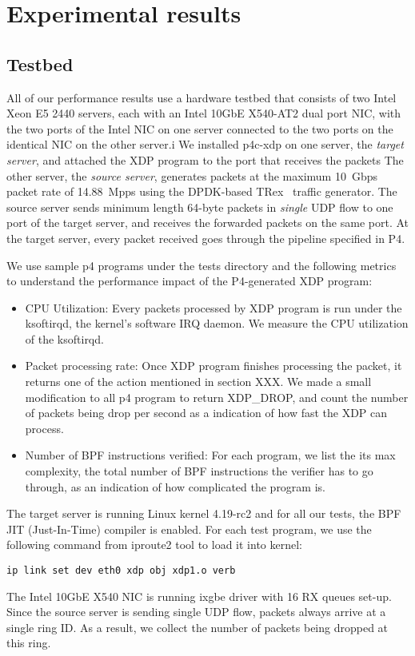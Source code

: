 \section{Experimental results}\label{sec:results}

\subsection{Testbed}
All of our performance results use a hardware testbed that consists of
two Intel Xeon E5 2440 servers, each with an Intel 10GbE X540-AT2 dual
port NIC, with the two ports of the Intel NIC on one server connected
to the two ports on the identical NIC on the other server.i
We installed p4c-xdp on one server, the {\em target server}, and
attached the XDP program to the port that receives the packets
The other server, the {\em source server}, generates packets
at the maximum 10~Gbps packet rate of 14.88~Mpps using the DPDK-based
TRex~\cite{trex} traffic generator.  The source server sends minimum
length 64-byte packets in {\em single} UDP flow to one port of the
target server, and receives the forwarded packets on the same port.
At the target server, every packet received goes through the
pipeline specified in P4.

We use sample p4 programs under the tests directory and the following
metrics to understand the performance impact of the P4-generated XDP
program:
\begin{itemize}
\item CPU Utilization: Every packets processed by XDP program is run
under the ksoftirqd, the kernel's software IRQ daemon.
We measure the CPU utilization of the ksoftirqd.
\item Packet processing rate: Once XDP program finishes processing the
packet, it returns one of the action mentioned in section XXX.
We made a small modification to all p4 program to return XDP\_DROP,
and count the number of packets being drop per second as a indication
of how fast the XDP can process.
\item Number of BPF instructions verified: For each program, we list
the its max complexity, the total number of BPF instructions the
verifier has to go through, as an indication of how complicated the
program is.
\end{itemize}

The target server is running Linux kernel 4.19-rc2 and for all our
tests, the BPF JIT (Just-In-Time) compiler is enabled. 
For each test program, we use the following
command from iproute2 tool to load it into kernel:
\begin{verbatim}
ip link set dev eth0 xdp obj xdp1.o verb
\end{verbatim}
The Intel 10GbE X540 NIC is running ixgbe driver with 16 RX queues
set-up. Since the source server is sending single UDP flow, packets
always arrive at a single ring ID.  As a result, we collect the number
of packets being dropped at this ring.

